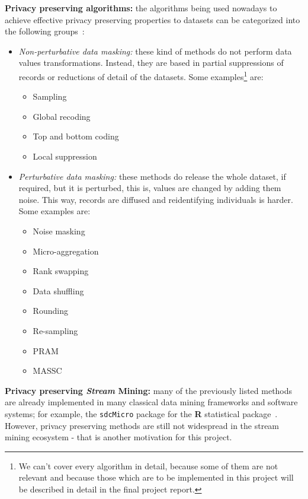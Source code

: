 \textbf{Privacy preserving algorithms:} the algorithms being used nowadays to achieve effective privacy preserving properties to datasets can be categorized into the following groups~\cite{book:StatisticalDisclosureControl}:
\begin{itemize}
	\item \textit{Non-perturbative data masking:} these kind of methods do not perform data values transformations. Instead, they are based in partial suppressions of records or reductions of detail of the datasets. Some examples\footnote{We can’t cover every algorithm in detail, because some of them are not relevant and because those which are to be implemented in this project will be described in detail in the final project report.} are:
	\begin{itemize}
		\item Sampling
		\item Global recoding
		\item Top and bottom coding
		\item Local suppression
	\end{itemize}
	
	\item \textit{Perturbative data masking:} these methods do release the whole dataset, if required, but it is perturbed, this is, values are changed by adding them noise. This way, records are diffused and reidentifying individuals is harder. Some examples are:
	\begin{itemize}
		\item Noise masking
		\item Micro-aggregation
		\item Rank swapping
		\item Data shuffling
		\item Rounding
		\item Re-sampling
		\item PRAM
		\item MASSC
	\end{itemize}
\end{itemize}

\textbf{Privacy preserving \textit{Stream} Mining:} many of the previously listed methods are already implemented in many classical data mining frameworks and software systems; for example, the \texttt{sdcMicro} package for the \textbf{R} statistical package~\cite{sdcMicro}. However, privacy preserving methods are still not widespread in the stream mining ecosystem - that is another motivation for this project.

